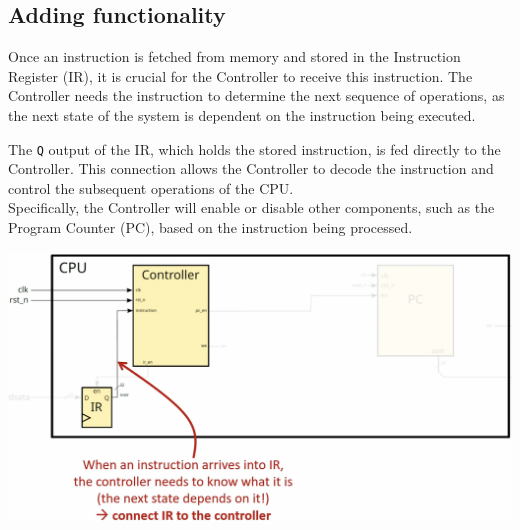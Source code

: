 \subsection{Adding functionality}
Once an instruction is fetched from memory and stored in the Instruction Register (IR), it is crucial for the Controller to receive this instruction. The Controller needs the instruction to determine the next sequence of operations, as the next state of the system is dependent on the instruction being executed. \\
\begin{minipage}[htp]{0.45\textwidth}
    The \texttt{Q} output of the IR, which holds the stored instruction, is fed directly to the Controller. This connection allows the Controller to decode the instruction and control the subsequent operations of the CPU. \\
Specifically, the Controller will enable or disable other components, such as the Program Counter (PC), based on the instruction being processed.

\end{minipage}
\hfill
\vline
\hfill
\begin{minipage}[htp]{0.45\textwidth}
    \begin{center}
        \includegraphics[width=1.2\textwidth]{chapters/chapter2a/images/p3.png}
    \end{center}
        
\end{minipage}


